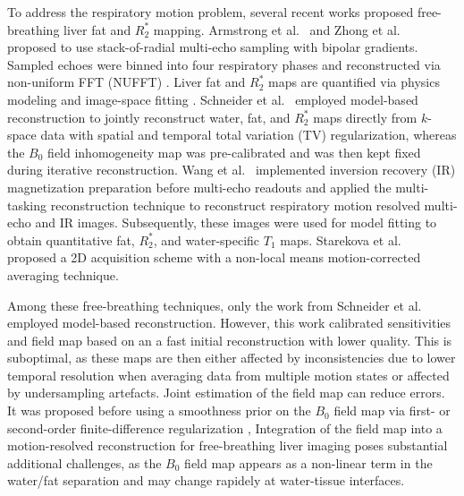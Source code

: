 \documentclass[journal,twoside,web]{ieeecolor}
\begin{document}
To address the respiratory motion problem, 
several recent works proposed free-breathing liver fat and $R_2^*$ mapping. 
Armstrong et al.~\cite{armstrong_2018_fat} and 
Zhong et al.~\cite{zhong_2020_r2sclinic,zhong_2020_resr2s} 
proposed to use stack-of-radial multi-echo sampling with bipolar gradients. 
Sampled echoes were binned into four respiratory phases 
and reconstructed via non-uniform FFT (NUFFT) \cite{fessler_2003_nufft}. 
Liver fat and $R_2^*$ maps are quantified 
via physics modeling \cite{yu_2007_t2sideal,yu_2008_mft2sideal,chebrolu_2010_indiwf} 
and image-space fitting \cite{reeder_2005_ideal,hernando_2010_gc,zhong_2014_wfadafit}. 
Schneider et al.~\cite{schneider_2020_mobawfr2s} 
employed model-based reconstruction 
\cite{block_2009_mobat2,fessler_2010_moba,doneva_2010_mobawf} 
to jointly reconstruct water, fat, and $R_2^*$ maps directly from $k$-space data 
with spatial and temporal total variation (TV) regularization, 
whereas the $B_0$ field inhomogeneity map was pre-calibrated \cite{hernando_2010_gc} 
and was then kept fixed during iterative reconstruction. 
Wang et al.~\cite{wang_2022_mt-me} implemented 
inversion recovery (IR) magnetization preparation before multi-echo readouts 
and applied the multi-tasking reconstruction technique \cite{christodoulou_2018_mt} 
to reconstruct respiratory motion resolved multi-echo and IR images. 
Subsequently, these images were used for model fitting \cite{hernando_2010_gc} 
to obtain quantitative fat, $R_2^*$, and water-specific $T_1$ maps. 
Starekova et al.~\cite{starekova_2022_fb-fat} proposed a 2D acquisition scheme 
with a non-local means \cite{buades_2005_nlm} motion-corrected averaging technique. 

Among these free-breathing techniques, only the work from Schneider et al. employed 
model-based reconstruction. However, this work calibrated sensitivities
and field map based on an a fast initial reconstruction with lower quality.
This is suboptimal, as these maps are then either affected by inconsistencies due 
to lower temporal resolution when averaging data from multiple motion states
or affected by undersampling artefacts.
Joint estimation of the field map can reduce errors. It was proposed 
before using a smoothness prior on the $B_0$ field map via first- or 
second-order finite-difference regularization 
\cite{sutton_2004_dynamicfield,olafsson_2008_joint,funai_2008_secondorder},
Integration of the field map into a motion-resolved reconstruction for
free-breathing liver imaging poses substantial additional challenges,
as the $B_0$ field map appears as a non-linear term in the water/fat separation
and may change rapidely at water-tissue interfaces.
\end{document}
